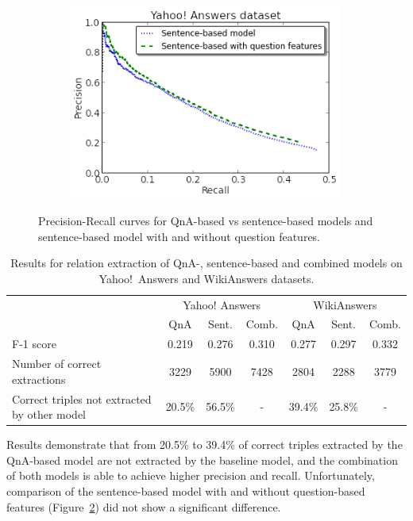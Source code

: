 \begin{figure}[h!]
\begin{subfigure}[h]{0.45\textwidth}
    \includegraphics[width=0.99\textwidth]{img/cqarelextract_noqf_vs_qf}
    \label{figure:factoid:cqarelextract:noqf_vs_qf}
\end{subfigure}
\caption{Precision-Recall curves for QnA-based vs sentence-based models and sentence-based model with and without question features.}
\label{figure:factoid:cqarelextract:pr_curve}
\end{figure}

\begin{table}
\centering
\small
\begin{tabular}{p{4.7cm}|ccc|ccc}
& \multicolumn{3}{c|}{Yahoo! Answers} & \multicolumn{3}{c}{WikiAnswers}\\
& QnA & Sent. & Comb. & QnA & Sent. & Comb.\\
\hline
F-1 score & 0.219 & 0.276 & 0.310 & 0.277 & 0.297 & 0.332\\
Number of correct extractions & 3229 & 5900 & 7428 & 2804 & 2288 & 3779 \\
Correct triples not extracted by other model & 20.5\% & 56.5\% & - & 39.4\% & 25.8\% & - \\
\end{tabular}
\caption{Results for relation extraction of QnA-, sentence-based and combined models on Yahoo!~Answers and WikiAnswers datasets.}
\label{table:factoid:cqarelextract:results}
\end{table}

Results demonstrate that from 20.5\% to 39.4\% of correct triples extracted by the QnA-based model are not extracted by the baseline model, and the combination of both models is able to achieve higher precision and recall.
Unfortunately, comparison of the sentence-based model with and without question-based features (Figure~\ref{figure:factoid:cqarelextract:pr_curve}) did not show a significant difference.

